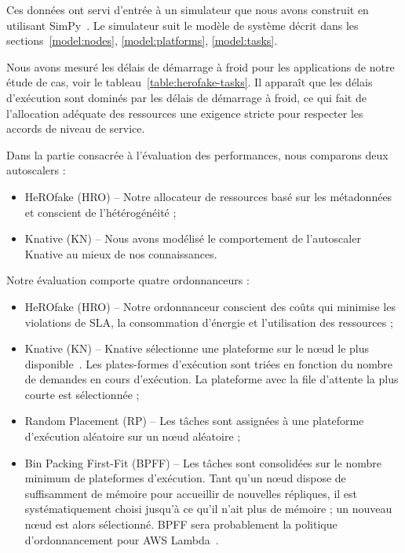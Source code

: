 Ces données ont servi d'entrée à un simulateur que nous avons construit en utilisant SimPy~\cite{simpy}. Le simulateur suit le modèle de système décrit dans les sections~\ref{model:nodes}, \ref{model:platforms}, \ref{model:tasks}.

Nous avons mesuré les délais de démarrage à froid pour les applications de notre étude de cas, voir le tableau~\ref{table:herofake-tasks}. Il apparaît que les délais d'exécution sont dominés par les délais de démarrage à froid, ce qui fait de l'allocation adéquate des ressources une exigence stricte pour respecter les accords de niveau de service.

Dans la partie consacrée à l'évaluation des performances, nous comparons deux autoscalers :

\begin{itemize}
    \item HeROfake (HRO) -- Notre allocateur de ressources basé sur les métadonnées et conscient de l'hétérogénéité ;
    \item Knative (KN) -- Nous avons modélisé le comportement de l'autoscaler Knative au mieux de nos connaissances.
\end{itemize}

Notre évaluation comporte quatre ordonnanceurs :

\begin{itemize}
    \item HeROfake (HRO) -- Notre ordonnanceur conscient des coûts qui minimise les violations de SLA, la consommation d'énergie et l'utilisation des ressources ;
    \item Knative (KN) -- Knative sélectionne une plateforme sur le nœud le plus disponible~\cite{sureshENSUREEfficientScheduling2020}. Les plates-formes d'exécution sont triées en fonction du nombre de demandes en cours d'exécution. La plateforme avec la file d'attente la plus courte est sélectionnée ;
    \item Random Placement (RP) -- Les tâches sont assignées à une plateforme d'exécution aléatoire sur un nœud aléatoire ;
    \item Bin Packing First-Fit (BPFF) -- Les tâches sont consolidées sur le nombre minimum de plateformes d'exécution. Tant qu'un nœud dispose de suffisamment de mémoire pour accueillir de nouvelles répliques, il est systématiquement choisi jusqu'à ce qu'il n'ait plus de mémoire ; un nouveau nœud est alors sélectionné. BPFF sera probablement la politique d'ordonnancement pour AWS Lambda~\cite{wangPeekingCurtainsServerlessb}.
\end{itemize}

